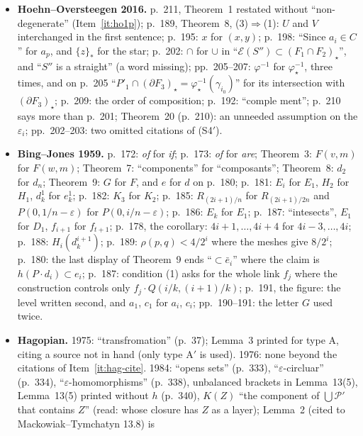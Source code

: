 \documentclass[11pt]{article}
\begin{document}
\begin{itemize}
\item \textbf{Hoehn--Oversteegen 2016.} p.~211, Theorem~1 restated without ``non-degenerate''
  (Item~\ref{it:ho1p}); p.~189, Theorem~8, (3)$\Rightarrow$(1): $U$ and $V$ interchanged in the first
  sentence; p.~195: $x$ for $(x,y)$; p.~198: ``Since $a_i\in C$'' for $a_p$, and $\{z\}_*$ for the
  star; p.~202: $\cap$ for $\cup$ in ``$\mathcal E(S'')\subset(F_1\cap F_2)_\star$'', and ``$S''$ is a
  straight'' (a word missing); pp.~205--207: $\varphi^{-1}$ for $\varphi_\star^{-1}$, three times,
  and on p.~205 ``$P'_1\cap(\partial F_3)_\star=\varphi_\star^{-1}(\gamma_{i_0})$'' for its
  intersection with $(\partial F_3)_\star$; p.~209: the order of composition; p.~192:
  ``comple ment''; p.~210 says more than p.~201; Theorem~20 (p.~210): an unneeded assumption on the
  $\varepsilon_i$; pp.~202--203: two omitted citations of (S4$'$).
\item \textbf{Bing--Jones 1959.} p.~172: \emph{of} for \emph{if}; p.~173: \emph{of} for
  \emph{are}; Theorem~3: $F(v,m)$ for $F(w,m)$; Theorem~7: ``components'' for ``composants'';
  Theorem~8: $d_2$ for $d_n$; Theorem~9: $G$ for $F$, and $e$ for $d$ on p.~180; p.~181: $E_i$ for
  $E_1$, $H_2$ for $H_1$, $d^1_k$ for $e^1_k$; p.~182: $K_3$ for $K_2$; p.~185:
  $R_{(2i+1)/n}$ for $R_{(2i+1)/2n}$ and $P(0,1/n-\varepsilon)$ for $P(0,i/n-\varepsilon)$; p.~186:
  $E_k$ for $E_1$; p.~187: ``intesects'', $E_1$ for $D_1$, $f_{i+1}$ for $f_{t+1}$; p.~178, the
  corollary: $4i+1,\ldots,4i+4$ for $4i-3,\ldots,4i$; p.~188: $H_i(d_k^{i+1})$; p.~189:
  $\rho(p,q)<4/2^i$ where the meshes give $8/2^i$; p.~180: the last display of Theorem~9 ends
  ``$\subset\bar e_i$'' where the claim is $h(P\cdot d_i)\subset e_i$; p.~187: condition (1) asks
  for the whole link $f_j$ where the construction controls only $f_j\cdot Q(i/k,(i+1)/k)$; p.~191, the figure: the level written second,
  and $a_1$, $c_1$ for $a_i$, $c_i$; pp.~190--191: the letter $G$ used twice.
\item \textbf{Hagopian.} 1975: ``transfromation'' (p.~37); Lemma~3 printed for type A, citing a
  source not in hand (only type A$'$ is used). 1976: none beyond the citations of
  Item~\ref{it:hag-cite}. 1984: ``opens sets'' (p.~333), ``$\varepsilon$-circluar'' (p.~334),
  ``$\varepsilon$-homomorphisms'' (p.~338), unbalanced brackets in Lemma~13(5), Lemma~13(5)
  printed without $h$ (p.~340), $K(Z)$ ``the component of $\bigcup\mathcal P'$ that contains $Z$''
  (read: whose closure has $Z$ as a layer); Lemma~2 (cited to Mackowiak--Tymchatyn 13.8) is

\end{itemize}
\end{document}
